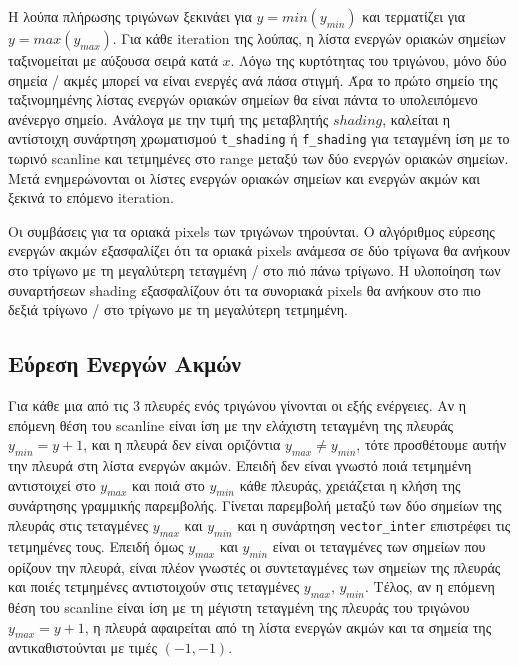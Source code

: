 \documentclass{article}
\begin{document}
Η λούπα πλήρωσης τριγώνων ξεκινάει για $y = min(y_{min})$ και τερματίζει για
$y = max(y_{max})$. Για κάθε iteration της λούπας, η λίστα ενεργών οριακών 
σημείων ταξινομείται με αύξουσα σειρά κατά $x$. Λόγω της κυρτότητας του
τριγώνου, μόνο δύο σημεία / ακμές 
μπορεί να είναι ενεργές ανά πάσα στιγμή. Άρα το πρώτο σημείο της ταξινομημένης 
λίστας ενεργών οριακών σημείων
θα είναι πάντα το υπολειπόμενο ανένεργο σημείο. Ανάλογα με την τιμή της μεταβλητής 
$shading$, καλείται η αντίστοιχη συνάρτηση χρω\-ματισμού \verb|t_shading| ή 
\verb|f_shading| για τεταγμένη ίση με το τωρινό scanline και τετμημένες στο range 
μεταξύ των δύο ενεργών οριακών σημείων. Μετά ενημερώνονται οι λίστες 
ενεργών οριακών σημείων και ενεργών ακμών και ξεκινά το επόμενο iteration.

Οι συμβάσεις για τα οριακά pixels των τριγώνων τηρούνται. Ο
αλγόριθμος εύρεσης ενεργών ακμών εξασφαλίζει ότι τα οριακά pixels ανάμεσα 
σε δύο τρίγωνα θα ανήκουν στο τρίγωνο με τη μεγαλύτερη τεταγμένη / στο
πιό πάνω τρίγωνο. Η υλοποίηση των συναρτήσεων shading εξασφαλίζουν ότι 
τα συνοριακά pixels θα ανήκουν στο πιο δεξιά τρίγωνο / στο τρίγωνο με
τη μεγαλύτερη τετμημένη.

\subsection{Εύρεση Ενεργών Ακμών}
Για κάθε μια από τις 3 πλευρές ενός τριγώνου γίνονται οι εξής ενέργειες.
Αν η επόμενη θέση του scanline είναι ίση με την ελάχιστη τεταγμένη της πλευράς
$y_{min} = y + 1$, και η πλευρά δεν είναι οριζόντια $y_{max} \neq y_{min}$, τότε 
προσθέτουμε αυτήν την πλευρά στη λίστα ενεργών ακμών. Επειδή δεν είναι
γνωστό ποιά τετμημένη αντιστοιχεί στο $y_{max}$ και ποιά στο $y_{min}$
κάθε πλευράς, χρειάζεται η κλήση της συνάρτησης γραμμικής παρεμβολής.
Γίνεται παρεμβολή μεταξύ των δύο σημείων της πλευράς στις τεταγμένες
$y_{max}$ και $y_{min}$ και η συνάρτηση \verb|vector_inter| επιστρέφει
τις τετμημένες τους. Επειδή
όμως $y_{max}$ και $y_{min}$ είναι οι τεταγμένες των σημείων που
ορίζουν την πλευρά,
είναι πλέον γνωστές οι συντεταγμένες των σημείων της πλευράς
και ποιές τετμημένες αντιστοιχούν στις τεταγμένες $y_{max}$, $y_{min}$.
Τέλος, αν η επόμενη θέση του scanline είναι ίση με τη μέγιστη τεταγμένη
της πλευράς του τριγώνου $y_{max} = y + 1$, η πλευρά αφαιρείται 
από τη λίστα ενεργών ακμών και τα σημεία της αντικαθιστούνται με τιμές $(-1, -1)$.
\end{document}
